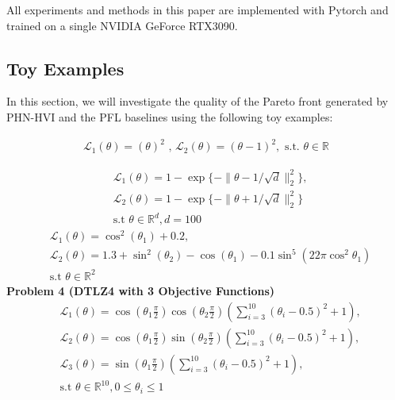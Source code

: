 \documentclass[letterpaper]{article} %
\newcommand{\ourmodel}{PHN-HVI }
\begin{document}
All experiments and methods in this paper are implemented with Pytorch \cite{pytorch} and trained on a single NVIDIA GeForce RTX3090.
\subsection{Toy Examples}
\label{sst:toy}
In this section, we will investigate the quality of the Pareto front generated by \ourmodel and the PFL baselines using the following toy examples:


\begin{equation}
  \begin{aligned}
    \mathcal{L}_1(\theta) = (\theta)^2 \text{ , } \mathcal{L}_2(\theta) = (\theta-1)^2, \text{ s.t. }\theta \in \mathbb{R}
\end{aligned}  
\end{equation}


\begin{equation}
\begin{aligned}
    & \mathcal{L}_1(\theta) = 1 - \exp\{ -\| \theta - 1/\sqrt{d} \|^2_2 \}, \\
    & \mathcal{L}_2(\theta) = 1 - \exp\{ -\| \theta + 1/\sqrt{d} \|^2_2 \} \\
    & \text{s.t }\theta \in \mathbb{R}^d, d=100
\end{aligned}
\label{pb1}
\end{equation}
\begin{align}
    & \mathcal{L}_1(\theta) = \cos^2(\theta_1) + 0.2, \\
    & \mathcal{L}_2(\theta) = 1.3 + \sin^2(\theta_2) - \cos(\theta_1) - 0.1\sin^5(22 \pi \cos^2\theta_1) \nonumber \\
    & \text{s.t }\theta \in \mathbb{R}^2 \nonumber
\end{align}
{\bf Problem 4 (DTLZ4 with 3 Objective Functions)}
\begin{align}
    & \mathcal{L}_1(\theta) = \cos(\theta_1 \frac{\pi}{2})\cos(\theta_2 \frac{\pi}{2})(\sum_{i=3}^{10} (\theta_i -0.5)^2 +1), \\
    & \mathcal{L}_2(\theta) = \cos(\theta_1 \frac{\pi}{2})\sin(\theta_2 \frac{\pi}{2})(\sum_{i=3}^{10} (\theta_i -0.5)^2 +1), \nonumber \\
    & \mathcal{L}_3(\theta) = \sin(\theta_1 \frac{\pi}{2})(\sum_{i=3}^{10} (\theta_i -0.5)^2 +1), \nonumber \\
    & \text{s.t }\theta \in \mathbb{R}^{10}, 0 \leq \theta_i \leq 1 \nonumber
    \label{pb4}
\end{align}
\end{document}

